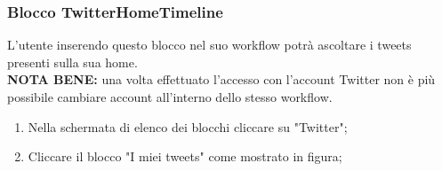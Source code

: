 \subsubsection{Blocco TwitterHomeTimeline} \label{twitterHo}
L'utente inserendo questo blocco nel suo workflow potrà ascoltare i tweets presenti sulla sua home. \\
\textbf{NOTA BENE:} una volta effettuato l'accesso con l'account Twitter non è più possibile cambiare account all'interno dello stesso workflow.
\begin{enumerate}
	\item Nella schermata di elenco dei blocchi cliccare su "Twitter";
	\item Cliccare il blocco "I miei tweets" come mostrato in figura;
	\begin{figure}[!ht]
		\centering

\end{figure}
\end{enumerate}
